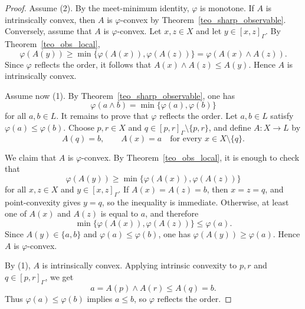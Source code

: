 \documentclass[11pt,a4paper]{article}
\begin{document}
\begin{proof}
Assume (2). By the meet-minimum identity, \(\varphi\) is monotone. If \(A\) is intrinsically convex, then \(A\) is \(\varphi\)-convex by Theorem~\ref{teo_sharp_observable}. Conversely, assume that \(A\) is \(\varphi\)-convex. Let \(x,z\in X\) and let \(y\in[x,z]_{\Gamma}\). By Theorem~\ref{teo_obs_local},
\begin{equation*}
\varphi(A(y))
\ge
\min\{\varphi(A(x)),\varphi(A(z))\}
=
\varphi(A(x)\wedge A(z)).
\end{equation*}
Since \(\varphi\) reflects the order, it follows that \(A(x)\wedge A(z)\le A(y)\). Hence \(A\) is intrinsically convex.

Assume now (1). By Theorem~\ref{teo_sharp_observable}, one has
\begin{equation*}
\varphi(a\wedge b)=\min\{\varphi(a),\varphi(b)\}
\end{equation*}
for all \(a,b\in L\). It remains to prove that \(\varphi\) reflects the order. Let \(a,b\in L\) satisfy \(\varphi(a)\le \varphi(b)\). Choose \(p,r\in X\) and \(q\in[p,r]_{\Gamma}\setminus\{p,r\}\), and define \(A:X\to L\) by
\begin{equation*}
A(q)=b,\qquad A(x)=a\quad\text{for every }x\in X\setminus\{q\}.
\end{equation*}

We claim that \(A\) is \(\varphi\)-convex. By Theorem~\ref{teo_obs_local}, it is enough to check that
\begin{equation*}
\varphi(A(y))\ge \min\{\varphi(A(x)),\varphi(A(z))\}
\end{equation*}
for all \(x,z\in X\) and \(y\in[x,z]_{\Gamma}\). If \(A(x)=A(z)=b\), then \(x=z=q\), and point-convexity gives \(y=q\), so the inequality is immediate. Otherwise, at least one of \(A(x)\) and \(A(z)\) is equal to \(a\), and therefore
\begin{equation*}
\min\{\varphi(A(x)),\varphi(A(z))\}\le \varphi(a).
\end{equation*}
Since \(A(y)\in\{a,b\}\) and \(\varphi(a)\le \varphi(b)\), one has \(\varphi(A(y))\ge \varphi(a)\). Hence \(A\) is \(\varphi\)-convex.

By (1), \(A\) is intrinsically convex. Applying intrinsic convexity to \(p,r\) and \(q\in[p,r]_{\Gamma}\), we get
\begin{equation*}
a=A(p)\wedge A(r)\le A(q)=b.
\end{equation*}
Thus \(\varphi(a)\le\varphi(b)\) implies \(a\le b\), so \(\varphi\) reflects the order.
\end{proof}
\end{document}
